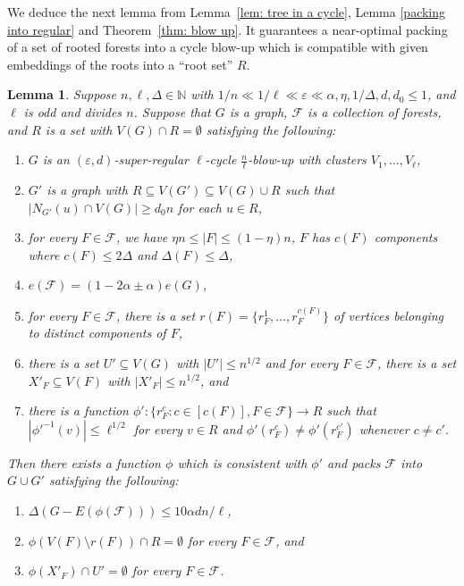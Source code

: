 \documentclass[a4paper, 11pt, reqno]{amsart}
\newtheorem{lemma}[definition]{Lemma}
\numberwithin{equation}{section}
\newcommand{\1}{{\rm 1\hspace*{-0.4ex}%
\rule{0.1ex}{1.52ex}\hspace*{0.2ex}}}
\newcommand{\N}{\mathbb N}
\newcommand{\cF}{\mathcal{F}}
\renewcommand{\epsilon}{\varepsilon}
\begin{document}
We deduce the next lemma from Lemma~\ref{lem: tree in a cycle}, Lemma \ref{packing into regular} and Theorem~\ref{thm: blow up}. It guarantees a near-optimal packing of a set of rooted forests into a cycle blow-up which is compatible with given embeddings of the roots into a ``root set'' $R$.

\begin{lemma}\label{lem: blow up advanced}
Suppose $n,\ell,\Delta \in \N$ with $1/n\ll 1/\ell \ll \epsilon \ll \alpha,\eta, 1/\Delta,d, d_0\leq 1$, and $\ell$ is odd and divides $n$. 
Suppose that $G$ is a graph, $\cF$ is a collection of forests, and $R$ is a set with $V(G)\cap R=\emptyset$ satisfying the following:
\begin{enumerate}[label=(a\arabic*)]
\item\label{item:A1} $G$ is an $(\epsilon,d)$-super-regular $\ell$-cycle $\frac{n}{\ell}$-blow-up with clusters $V_1,\ldots, V_\ell$,
\item\label{item:A2} $G'$ is a graph with $R\subseteq V(G')\subseteq V(G)\cup R$ such that $|N_{G'}(u)\cap V(G)|\geq d_0 n$ for each $u\in R$,

\item\label{item:A3} for every $F\in \cF$, we have $\eta n \leq |F| \leq (1-\eta)n$, $F$ has $c(F)$ components where $c(F)\leq 2\Delta$ and $\Delta(F)\leq \Delta$,
\item\label{item:A4} $e(\cF)= (1-2\alpha\pm \alpha)e(G)$,
\item\label{item:A5} for every $F\in \cF$, there is a set $r(F)=\{r^1_F,\dots, r^{c(F)}_F\}$ of vertices belonging to distinct components of $F$,
\item\label{item:A6} there is a set $U'\subseteq V(G)$ with $|U'|\leq n^{1/2}$ and 
for every $F\in \cF$, there is a set $X'_F \subseteq V(F)$ with $|X'_F|\leq n^{1/2}$, and
\item\label{item:A7} there is a function $\phi':\{r^c_F: c\in [c(F)], F\in \cF\}\to R$ such that $|\phi'^{-1}(v)|\leq \ell^{1/2}$ for every $v\in R$ and $\phi'(r^c_F)\neq \phi'(r^{c'}_F)$ whenever $c\neq c'$.
\end{enumerate}
Then there exists a function $\phi$ which is consistent with $\phi'$ and packs $\cF$ into $G \cup G'$ satisfying the following:
\begin{enumerate}[label=(A\arabic*)]
\item\label{item:B1} $\Delta( G-E(\phi(\cF)) ) \leq 10\alpha d n/\ell$,
\item\label{item:B2} $\phi(V(F)\setminus r(F)) \cap R =\emptyset$ for every $F\in \cF$, and
\item\label{item:B3} $\phi(X'_F) \cap U' =\emptyset$ for every $F\in \cF$.
\end{enumerate}
\end{lemma}
\end{document}
